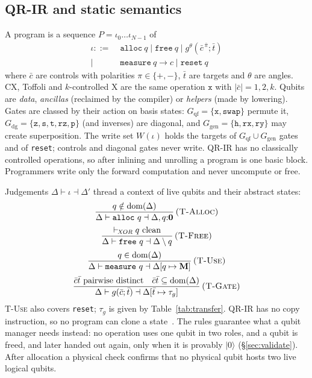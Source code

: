 \documentclass[conference,a4paper]{IEEEtran}
\newcommand{\instr}[1]{\texttt{#1}}
\begin{document}
\subsection{QR-IR and static semantics}
\label{sec:ir}
A program is a sequence $P=\iota_0\ldots\iota_{N-1}$ of
\begin{align*}
\iota ::=\;& \instr{alloc}\ q \mid \instr{free}\ q \mid g^{\theta}(\bar c^{\,\bar\pi};\bar t)\\ \mid\;& \instr{measure}\ q\to c \mid \instr{reset}\ q
\end{align*}
where $\bar c$ are controls with polarities $\pi\in\{+,-\}$, $\bar t$ are targets and $\theta$ are angles. CX, Toffoli and $k$-controlled X are the same operation $\instr{x}$ with $|\bar c|=1,2,k$. Qubits are \emph{data}, \emph{ancillas} (reclaimed by the compiler) or \emph{helpers} (made by lowering). Gates are classed by their action on basis states: $G_{\mathrm{qf}}=\{\instr{x},\instr{swap}\}$ permute it, $G_{\mathrm{dg}}=\{\instr{z},\instr{s},\instr{t},\instr{rz},\instr{p}\}$ (and inverses) are diagonal, and $G_{\mathrm{gen}}=\{\instr{h},\instr{rx},\instr{ry}\}$ may create superposition. The write set $W(\iota)$ holds the targets of $G_{\mathrm{qf}}\cup G_{\mathrm{gen}}$ gates and of \instr{reset}; controls and diagonal gates never write. QR-IR has no classically controlled operations, so after inlining and unrolling a program is one basic block. Programmers write only the forward computation and never uncompute or free.

Judgements $\Delta\vdash\iota\dashv\Delta'$ thread a context of live qubits and their abstract states:
\begin{gather*}
\frac{q\notin\mathrm{dom}(\Delta)}{\Delta\vdash \instr{alloc}\ q\dashv \Delta,q{:}\mathbf{0}}\,\textsc{(T-Alloc)}
\\[2pt]
\frac{\vdash_{\!\mathit{XOR}} q\ \text{clean}}{\Delta\vdash \instr{free}\ q\dashv \Delta\setminus q}\,\textsc{(T-Free)}\\[2pt]
\frac{q\in\mathrm{dom}(\Delta)}{\Delta\vdash \instr{measure}\ q \dashv \Delta[q\mapsto\mathbf{M}]}\,\textsc{(T-Use)}\\[2pt]
\frac{\bar c\bar t\ \text{pairwise distinct}\quad \bar c\bar t\subseteq\mathrm{dom}(\Delta)}{\Delta\vdash g(\bar c;\bar t)\dashv \Delta[\bar t\mapsto \tau_g]}\,\textsc{(T-Gate)}
\end{gather*}
\textsc{T-Use} also covers \instr{reset}; $\tau_g$ is given by Table~\ref{tab:transfer}. QR-IR has no copy instruction, so no program can clone a state~\cite{wootters1982}. The rules guarantee what a qubit manager needs instead: no operation uses one qubit in two roles, and a qubit is freed, and later handed out again, only when it is provably $|0\rangle$ (\S\ref{sec:validate}). After allocation a physical check confirms that no physical qubit hosts two live logical qubits.
\end{document}

